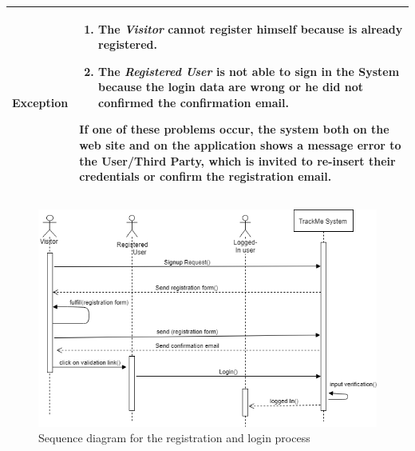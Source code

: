 \begin{table}[H]
\begin{tabular}{|p{3.5cm}|p{10.3cm}|}
    \hline
    \textbf{\large{Exception}} 			& \begin{enumerate}[leftmargin=0.5cm]
                                          	\item The \emph{Visitor} cannot register himself because is already registered.
                                          	\item The \emph{Registered User} is not able to sign in the System because the login data are wrong or he did not confirmed the confirmation email.
                                            \end{enumerate}
    										If one of these problems occur, the system both on the web site and on the application shows a message error to the User/Third Party, which is invited to re-insert their credentials or confirm the registration email.\\
    
    \hline
    
    \end{tabular}
	
\end{table}
\begin{figure}[H]

    \centering
    \includegraphics[scale=0.4]{rasdL/Pictures/login1.png}
    \caption{Sequence diagram for the registration and login process}
    
\end{figure}


